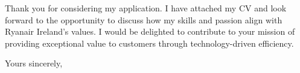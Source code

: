 \documentclass[11pt]{letter}
\begin{document}
\begin{letter}{}
Thank you for considering my application. I have attached my CV and look forward
to the opportunity to discuss how my skills and passion align with Ryanair
Ireland’s values. I would be delighted to contribute to your mission of
providing exceptional value to customers through technology-driven efficiency.

\closing{Yours sincerely,}

\end{letter}
\end{document}
